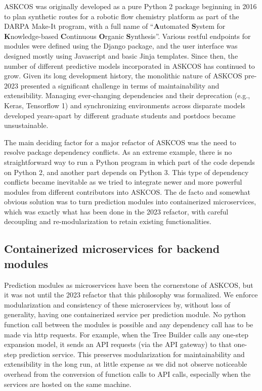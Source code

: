 \documentclass[pdflatex,sn-mathphys-num]{sn-jnl}%
\theoremstyle{thmstyleone}%
\theoremstyle{thmstyletwo}%
\theoremstyle{thmstylethree}%
\begin{document}
ASKCOS was originally developed as a pure Python 2 package beginning in 2016 to plan synthetic routes for a robotic flow chemistry platform as part of the DARPA Make-It program, with a full name of ``\textbf{A}utomated \textbf{S}ystem for \textbf{K}nowledge-based \textbf{C}ontinuous \textbf{O}rganic \textbf{S}ynthesis''. Various restful endpoints for modules were defined using the Django package, and the user interface was designed mostly using Javascript and basic Jinja templates. Since then, the number of different predictive models incorporated in ASKCOS has continued to grow. Given its long development history, the monolithic nature of ASKCOS pre-2023 presented a significant challenge in terms of maintainability and extensibility. Managing ever-changing dependencies and their deprecation (e.g., Keras, Tensorflow 1) and synchronizing environments across disparate models developed years-apart by different graduate students and postdocs became unsustainable.

The main deciding factor for a major refactor of ASKCOS was the need to resolve package dependency conflicts. As an extreme example, there is no straightforward way to run a Python program in which part of the code depends on Python 2, and another part depends on Python 3. This type of dependency conflicts became inevitable as we tried to integrate newer and more powerful modules from different contributors into ASKCOS. The de facto and somewhat obvious solution was to turn prediction modules into containerized microservices, which was exactly what has been done in the 2023 refactor, with careful decoupling and re-modularization to retain existing functionalities.

\subsection{Containerized microservices for backend modules} \label{microservices}

Prediction modules as microservices have been the cornerstone of ASKCOS, but it was not until the 2023 refactor that this philosophy was formalized. We enforce modularization and consistency of these microservices by, without loss of generality, having one containerized service per prediction module. No python function call between the modules is possible and any dependency call has to be made via http requests. For example, when the Tree Builder calls any one-step expansion model, it sends an API requests (via the API gateway) to that one-step prediction service. This preserves modularization for maintainability and extensibility in the long run, at little expense as we did not observe noticeable overhead from the conversion of function calls to API calls, especially when the services are hosted on the same machine.
\end{document}
